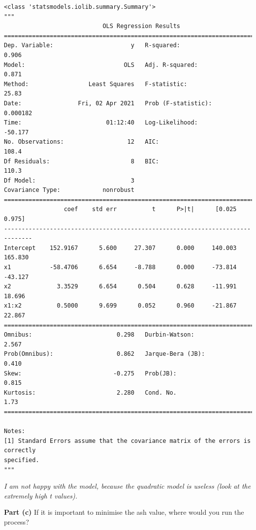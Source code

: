 \documentclass[11pt]{article}
\makeatletter
\newcommand{\boxspacing}{\kern\kvtcb@left@rule\kern\kvtcb@boxsep}
\newcommand{\prompt}[4]{
        \ttfamily\llap{{\color{#2}[#3]:\hspace{3pt}#4}}\vspace{-\baselineskip}
    }
\makeatother
\begin{document}
            \begin{tcolorbox}[breakable, size=fbox, boxrule=.5pt, pad at break*=1mm, opacityfill=0]
\prompt{Out}{outcolor}{61}{\boxspacing}
\begin{Verbatim}[commandchars=\\\{\}]
<class 'statsmodels.iolib.summary.Summary'>
"""
                            OLS Regression Results
==============================================================================
Dep. Variable:                      y   R-squared:                       0.906
Model:                            OLS   Adj. R-squared:                  0.871
Method:                 Least Squares   F-statistic:                     25.83
Date:                Fri, 02 Apr 2021   Prob (F-statistic):           0.000182
Time:                        01:12:40   Log-Likelihood:                -50.177
No. Observations:                  12   AIC:                             108.4
Df Residuals:                       8   BIC:                             110.3
Df Model:                           3
Covariance Type:            nonrobust
==============================================================================
                 coef    std err          t      P>|t|      [0.025      0.975]
------------------------------------------------------------------------------
Intercept    152.9167      5.600     27.307      0.000     140.003     165.830
x1           -58.4706      6.654     -8.788      0.000     -73.814     -43.127
x2             3.3529      6.654      0.504      0.628     -11.991      18.696
x1:x2          0.5000      9.699      0.052      0.960     -21.867      22.867
==============================================================================
Omnibus:                        0.298   Durbin-Watson:                   2.567
Prob(Omnibus):                  0.862   Jarque-Bera (JB):                0.410
Skew:                          -0.275   Prob(JB):                        0.815
Kurtosis:                       2.280   Cond. No.                         1.73
==============================================================================

Notes:
[1] Standard Errors assume that the covariance matrix of the errors is correctly
specified.
"""
\end{Verbatim}
\end{tcolorbox}
        
    \emph{I am not happy with the model, because the quadratic model is
useless (look at the extremely high t values).}

    \textbf{Part (c)} If it is important to minimise the ash value, where
would you run the process?
\end{document}
